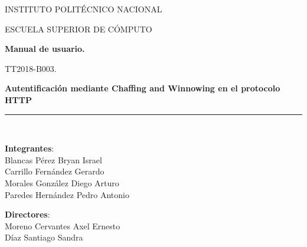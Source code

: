 \documentclass[12pt, a4paper, titlepage]{report}
\begin{document}
\begin{titlepage}
		\begin{center}
			
			\begin{LARGE}
				\textcolor{guindapoli}{INSTITUTO POLITÉCNICO NACIONAL}\\
			\end{LARGE}	
			
			\vspace*{0.2in}
			
			\begin{Large}
				\textcolor{azulescom}{ESCUELA SUPERIOR DE CÓMPUTO}\\
			\end{Large}		
			
			\vspace*{0.4in}
			
			\begin{Large}
				\textbf{Manual de usuario.}\\
			\end{Large}
			
			\begin{large}
				TT2018-B003.\\
			\end{large}
			
			\vspace*{0.2in}
			
			\begin{Large}
				\textbf{Autentificación mediante Chaffing and Winnowing en el protocolo HTTP}\\
			\end{Large}
			
			\vspace*{0.2in}
			
			\rule{80mm}{.1mm}\\
			\vspace*{0.1in}
			
			\begin{large}
				\begin{center}
					\textbf{Integrantes}:\\
					Blancas Pérez Bryan Israel\\
					Carrillo Fernández Gerardo\\
					Morales González Diego Arturo\\
					Paredes Hernández Pedro Antonio\\
				\end{center}
			\end{large}
			
			\vspace*{0.2in}
			
			\begin{large}
				\textbf{Directores}:\\
				Moreno Cervantes Axel Ernesto\\
				Díaz Santiago Sandra\\
			\end{large}
			
		\end{center}
	
	\end{titlepage}
\end{document}

